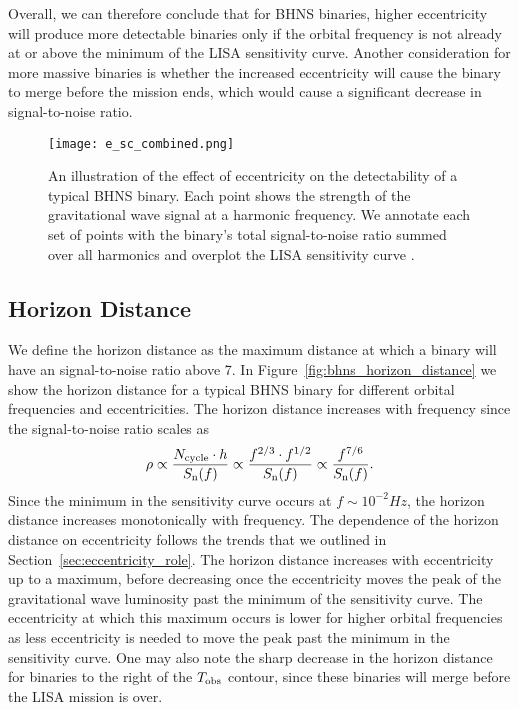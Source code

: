 Overall, we can therefore conclude that for BHNS binaries, higher eccentricity will produce more detectable binaries only if the orbital frequency is not already at or above the minimum of the LISA sensitivity curve. Another consideration for more massive binaries is whether the increased eccentricity will cause the binary to merge before the mission ends, which would cause a significant decrease in signal-to-noise ratio.

\begin{figure}[htb]
    \centering
    \texttt{[image: e\_sc\_combined.png]}
    \caption{An illustration of the effect of eccentricity on the detectability of a typical BHNS binary. Each point shows the strength of the gravitational wave signal at a harmonic frequency. We annotate each set of points with the binary's total signal-to-noise ratio summed over all harmonics and overplot the LISA sensitivity curve \citep{Robson+2019}.}
    \label{fig:ecc_effects}
\end{figure}

\subsection{Horizon Distance}

We define the horizon distance as the maximum distance at which a binary will have an signal-to-noise ratio above 7. In Figure~\ref{fig:bhns_horizon_distance} we show the horizon distance for a typical BHNS binary for different orbital frequencies and eccentricities. The horizon distance increases with frequency since the signal-to-noise ratio scales as
\begin{equation}
    \rho \propto \frac{N_{\rm cycle} \cdot h}{S_{\rm n}(f)} \propto \frac{f^{2/3} \cdot f^{1/2}}{S_{\rm n}(f)} \propto \frac{f^{7/6}}{S_{\rm n}(f)}.
\end{equation}
Since the minimum in the sensitivity curve occurs at $f \sim 10^{-2} \unit{Hz}$, the horizon distance increases monotonically with frequency. The dependence of the horizon distance on eccentricity follows the trends that we outlined in Section~\ref{sec:eccentricity_role}. The horizon distance increases with eccentricity up to a maximum, before decreasing once the eccentricity moves the peak of the gravitational wave luminosity past the minimum of the sensitivity curve. The eccentricity at which this maximum occurs is lower for higher orbital frequencies as less eccentricity is needed to move the peak past the minimum in the sensitivity curve. One may also note the sharp decrease in the horizon distance for binaries to the right of the $T_{\rm obs}$ contour, since these binaries will merge before the LISA mission is over.

